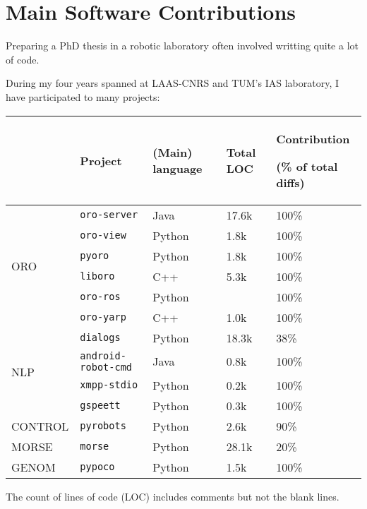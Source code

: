 \chapter{Main Software Contributions}
\label{chapt|software-contrib}

Preparing a PhD thesis in a robotic laboratory often involved writting quite a
lot of code.

During my four years spanned at LAAS-CNRS and TUM's IAS laboratory, I have
participated to many projects:

\begin{center}

\begin{tabular}{llllp{4cm}}
\toprule
 & {\bf Project} & (Main) language & Total LOC & Contribution \par (\% of total diffs) \\
\midrule

\multirow{6}{1cm}{ORO} & {\tt oro-server} & Java & 17.6k & 100\% \\
 & {\tt oro-view} & Python & 1.8k & 100\% \\
 & {\tt pyoro} & Python & 1.8k & 100\% \\
 & {\tt liboro} & C++ & 5.3k & 100\% \\
 & {\tt oro-ros} & Python & & 100\% \\
 & {\tt oro-yarp} & C++ & 1.0k & 100\% \\
\midrule
\multirow{4}{1cm}{NLP} & {\tt dialogs} & Python & 18.3k & 38\% \\
 & {\tt android-robot-cmd} & Java & 0.8k & 100\% \\
 & {\tt xmpp-stdio} & Python & 0.2k & 100\% \\
 & {\tt gspeett} & Python & 0.3k & 100\% \\
\midrule
CONTROL & {\tt pyrobots} & Python & 2.6k & 90\% \\
\midrule
MORSE & {\tt morse} & Python & 28.1k & 20\% \\
\midrule
GENOM & {\tt pypoco} & Python & 1.5k & 100\% \\
\bottomrule

\end{tabular}
\end{center}


The count of lines of code (LOC) includes comments but not the blank lines.

